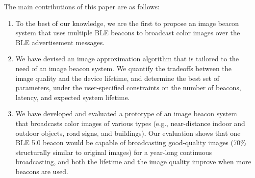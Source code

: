 The main contributions of this paper are as follows:

\begin{enumerate}%
	\item To the best of our knowledge, we are the first to propose an image beacon system that uses multiple BLE beacons to broadcast color images over the BLE advertisement messages.
	\item We have devised an image approximation algorithm that is tailored to the need of an image beacon system. We quantify the tradeoffs between the image quality and the device lifetime, and determine the best set of parameters, under the user-specified constraints on the number of beacons, latency, and expected system lifetime.
  \item We have developed and evaluated a prototype of an image beacon system that broadcasts color images of various types (e.g., near-distance indoor and outdoor objects, road signs, and buildings). Our evaluation shows that one BLE 5.0 beacon would be capable of broadcasting good-quality images (70\% structurally similar to original images) for a year-long continuous broadcasting, and both the lifetime and the image quality improve when more beacons are used.
\end{enumerate}
